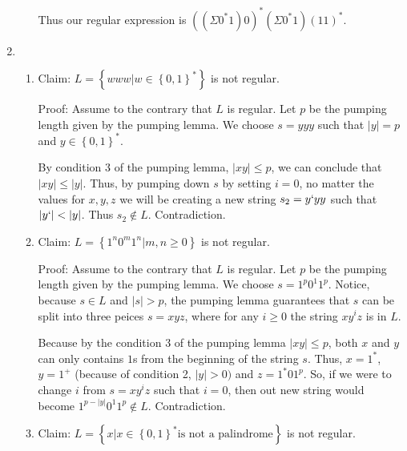 \documentclass{article}
\newcommand{\set}[1]{{\left\{#1\right\}}}    %
\newcommand{\abs}[1]{\left\lvert #1 \right\rvert}
\begin{document}
\begin{enumerate}
\begin{enumerate}

                Thus our regular expression is $((\Sigma0^*1)0)^*(\Sigma0^*1)(11)^*$.
        \end{enumerate}
    \item %
        \begin{enumerate}
            \item
                Claim: $L = \set{www|w \in \set{0,1}^*}$ is not regular.

                Proof: Assume to the contrary that $L$ is regular.
                Let $p$ be the pumping length given by the pumping lemma.
                We choose $s = yyy$ such that $\abs{y} = p$ and $y \in \set{0,1}^*$.

                By condition 3 of the pumping lemma, $\abs{xy} \le p$, we can conclude that $\abs{xy} \le \abs{y}$.
                Thus, by pumping down $s$ by setting $i = 0$, no matter the values for $x,y,z$ we will be creating a new string $s_2 = y`yy$ such that $\abs{y`} < \abs{y}$.
                Thus $s_2 \not\in L$. Contradiction.
            \item
                Claim: $L = \set{1^n0^m1^n | m, n \ge 0}$ is not regular.

                Proof: Assume to the contrary that $L$ is regular.
                Let $p$ be the pumping length given by the pumping lemma.
                We choose $s = 1^{p}0^{1}1^{p}$.
                Notice, because $s \in L$ and $\abs{s} > p$, the pumping lemma guarantees that $s$ can be split into three peices $s = xyz$, where for any $i \ge 0$ the string $xy^iz$ is in $L$.

                Because by the condition 3 of the pumping lemma $\abs{xy} \le p$, both $x$ and $y$ can only contains $1$s from the beginning of the string $s$.
                Thus, $x = 1^*$, $y = 1^+$ (because of condition 2, $\abs{y} > 0)$ and $z = 1^*01^p$.
                So, if we were to change $i$ from $s = xy^iz$ such that $i=0$, then out new string would become $1^{p-\abs{y}}0^{1}1^{p} \not\in L$. Contradiction.
            \item
                Claim: $L = \set{x|x\in\set{0,1}^* \text{is not a palindrome}}$ is not regular.


\end{enumerate}
\end{enumerate}
\end{document}
